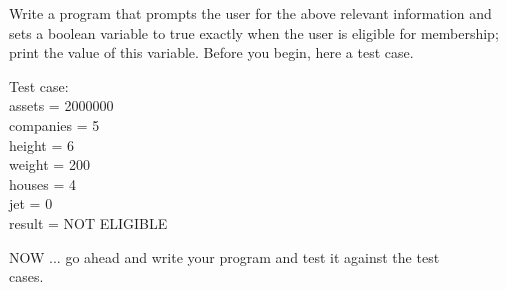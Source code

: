 \documentclass[
]{article}
\begin{document}
Write a program that prompts the user for the above relevant information
and sets a boolean variable to true exactly when the user is eligible
for membership; print the value of this variable. Before you begin, here
a test case.

Test case:\\
assets = 2000000\\
companies = 5\\
height = 6\\
weight = 200\\
houses = 4\\
jet = 0\\
result = NOT ELIGIBLE

NOW ... go ahead and write your program and test it against the test\\
cases.
\end{document}
